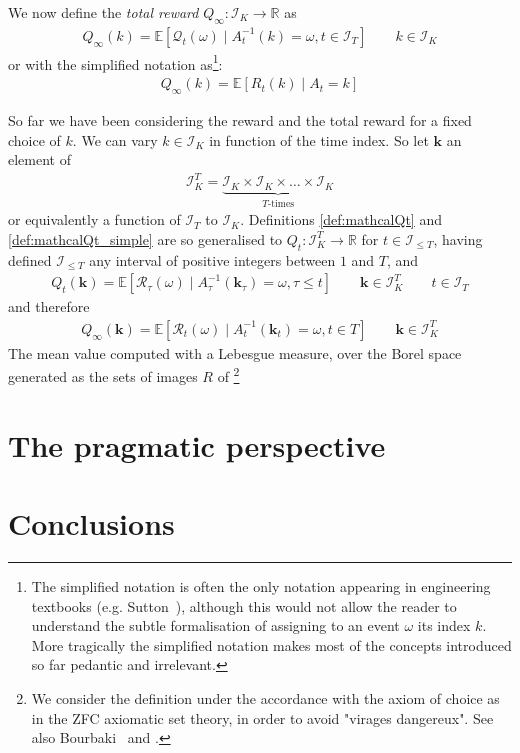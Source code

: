 \documentclass[]{scrartcl}
\begin{document}
We now define the \emph{total reward} $Q_{\infty}: \mathcal{I}_K \rightarrow \mathbb{R}$ as
\begin{align}\label{def:mathcalQinf}
Q_{\infty}(k) = \mathbb{E} \left[ \mathcal{Q}_{t}(\omega) \mid A^{-1}_{t}(k) = \omega, t \in \mathcal{I}_T \right]
\qquad
k \in \mathcal{I}_K 
\end{align}
or with the simplified notation as\footnote{
    The simplified notation is often the only notation appearing in engineering textbooks (e.g. Sutton~\cite{sutton2018reinforcement}), although this would not allow the reader to understand the subtle formalisation of assigning to an event $\omega$ its index $k$. More tragically the simplified notation makes most of the concepts introduced so far pedantic and irrelevant.
}:
\begin{align}\label{def:mathcalQinf_simple}
Q_{\infty}(k) = \mathbb{E} \left[ R_{t}(k) \mid A_{t} = k \right]
\end{align}

So far we have been considering the reward and the total reward for a fixed choice of $k$. We can vary $k\in \mathcal{I}_K$ in function of the time index. So let $\mathbf{k}$ an element of
\begin{align*}
\mathcal{I}_K^T = \underbrace{\mathcal{I}_K\times \mathcal{I}_K \times \dots \times \mathcal{I}_K}_{T\text{-times}}
\end{align*}
or equivalently a function of $\mathcal{I}_T$ to $\mathcal{I}_K$. 
Definitions \ref{def:mathcalQt} and \ref{def:mathcalQt_simple} are so generalised to $Q_t:\mathcal{I}_K^T \rightarrow \mathbb{R}$ for $t\in\mathcal{I}_{\leq T}$, having defined $\mathcal{I}_{\leq T}$ any interval of positive integers between $1$ and $T$, and
\begin{align*}
Q_t(\mathbf{k}) = \mathbb{E} \left[ \mathcal{R}_{\tau}(\omega)
\mid
A^{-1}_{\tau}(\mathbf{k}_{\tau}) = \omega, \tau \leq t \right]
\qquad 
\mathbf{k} \in \mathcal{I}_K^T
\qquad
t \in \mathcal{I}_T
\end{align*}
and therefore 
\begin{align*}
Q_{\infty}(\mathbf{k}) = \mathbb{E} \left[ \mathcal{R}_{t}(\omega)
\mid
A^{-1}_{t}(\mathbf{k}_{t}) = \omega, t \in T \right]
\qquad 
\mathbf{k} \in \mathcal{I}_K^T
\end{align*}
The mean value computed with a Lebesgue measure, over the Borel space generated as the sets of images $R$ of \footnote{We consider the definition under the accordance with the axiom of choice as in the ZFC axiomatic set theory, in order to avoid "virages dangereux". See also Bourbaki~\cite{bourbaki2004theory} and \cite{takeuti1982classes}.}

\section{The pragmatic perspective}
\label{se:pragmatic_perspective}


\section{Conclusions}
\label{se:outro}



 

\end{document}
